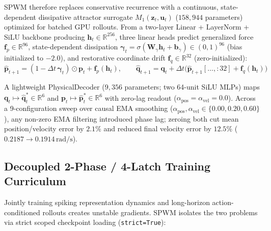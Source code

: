 \documentclass[11pt]{article}
\begin{document}
SPWM therefore replaces conservative recurrence with a continuous, state-dependent dissipative attractor surrogate $M_1(\mathbf{z}_t, \mathbf{u}_t)$ ($158{,}944$ parameters) optimized for batched GPU rollouts. From a two-layer Linear + LayerNorm + SiLU backbone producing $\mathbf{h}_t \in \mathbb{R}^{256}$, three linear heads predict generalized force $\mathbf{f}_p \in \mathbb{R}^{96}$, state-dependent dissipation $\boldsymbol{\gamma}_t = \sigma(\mathbf{W}_\gamma \mathbf{h}_t + \mathbf{b}_\gamma) \in (0, 1)^{96}$ (bias initialized to $-2.0$), and restorative coordinate drift $\mathbf{f}_q \in \mathbb{R}^{32}$ (zero-initialized):
\[
\hat{\mathbf{p}}_{t+1} = (1 - \Delta t\,\boldsymbol{\gamma}_t)\odot\mathbf{p}_t + \mathbf{f}_p(\mathbf{h}_t), \qquad \hat{\mathbf{q}}_{t+1} = \mathbf{q}_t + \Delta t\big(\hat{\mathbf{p}}_{t+1}[\dots, :32] + \mathbf{f}_q(\mathbf{h}_t)\big)
\]

A lightweight PhysicalDecoder ($9{,}356$ parameters; two 64-unit SiLU MLPs) maps $\mathbf{q}_t \mapsto \hat{\mathbf{q}}^*_t \in \mathbb{R}^6$ and $\mathbf{p}_t \mapsto \hat{\mathbf{p}}^*_t \in \mathbb{R}^6$ with zero-lag readout ($\alpha_{\text{pos}} = \alpha_{\text{vel}} = 0.0$). Across a 9-configuration sweep over causal EMA smoothing ($\alpha_{\text{pos}}, \alpha_{\text{vel}} \in \{0.00, 0.20, 0.60\}$), any non-zero EMA filtering introduced phase lag; zeroing both cut mean position/velocity error by $2.1\%$ and reduced final velocity error by $12.5\%$ ($0.2187 \to 0.1914\,\text{rad/s}$).

\subsection{Decoupled 2-Phase / 4-Latch Training Curriculum}

Jointly training spiking representation dynamics and long-horizon action-conditioned rollouts creates unstable gradients. SPWM isolates the two problems via strict scoped checkpoint loading (\texttt{strict=True}):
\end{document}
